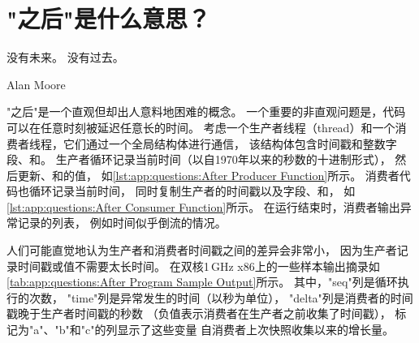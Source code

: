 
\section{"之后"是什么意思？}
\label{sec:app:questions:What Does ``After'' Mean?}
%
\epigraph{没有未来。
	  没有过去。}
	 {Alan Moore}

"之后"是一个直观但却出人意料地困难的概念。
一个重要的非直观问题是，代码可以在任意时刻被延迟任意长的时间。
考虑一个生产者线程（thread）和一个消费者线程，它们通过一个全局结构体进行通信，
该结构体包含时间戳和整数字段、和。
生产者循环记录当前时间（以自1970年以来的秒数的十进制形式），
然后更新、和的值，
如\cref{lst:app:questions:After Producer Function}所示。
消费者代码也循环记录当前时间，
同时复制生产者的时间戳以及字段、和，
如\cref{lst:app:questions:After Consumer Function}所示。
在运行结束时，消费者输出异常记录的列表，
例如时间似乎倒流的情况。

\begin{listing}

\caption{"之后"生产者函数}
\label{lst:app:questions:After Producer Function}
\end{listing}

\begin{listing}
\caption{"之后"消费者函数}
\label{lst:app:questions:After Consumer Function}
\end{listing}

\QuickQuizEnd

人们可能直觉地认为生产者和消费者时间戳之间的差异会非常小，
因为生产者记录时间戳或值不需要太长时间。
在双核1\,GHz x86上的一些样本输出摘录如
\cref{tab:app:questions:After Program Sample Output}所示。
其中，"seq"列是循环执行的次数，
"time"列是异常发生的时间（以秒为单位），
"delta"列是消费者的时间戳晚于生产者时间戳的秒数
（负值表示消费者在生产者之前收集了时间戳），
标记为"a"、"b"和"c"的列显示了这些变量
自消费者上次快照收集以来的增长量。

